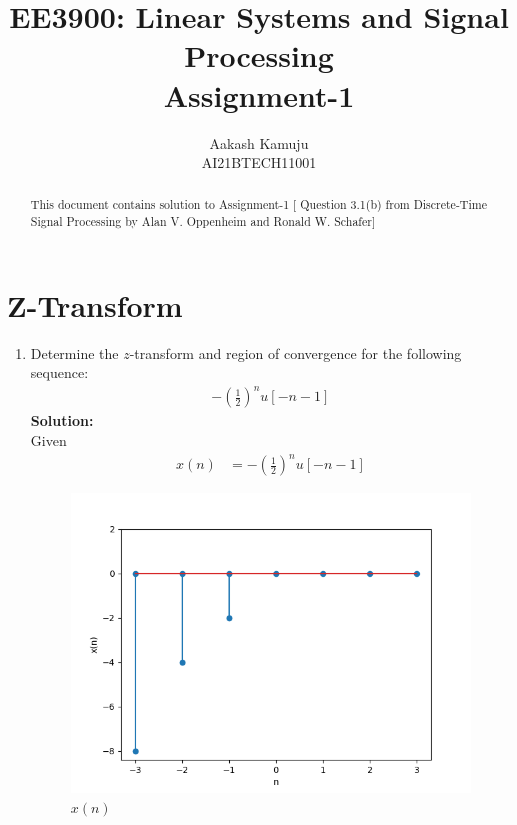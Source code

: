\documentclass[journal,12pt,twocolumn]{IEEEtran}
\newcommand{\solution}{\noindent \textbf{Solution: }}
\providecommand{\sbrak}[1]{\ensuremath{\left[#1\right]}}
\numberwithin{equation}{section}
\begin{document}
                             
\title{ EE3900: Linear Systems and Signal Processing \\ {Assignment-1}}
\author{Aakash Kamuju\\ \normalsize AI21BTECH11001 }
 \maketitle 
 \begin{abstract}
 This document contains solution to Assignment-1 [ Question 3.1(b) from Discrete-Time Signal Processing by Alan V. Oppenheim and Ronald W. Schafer]
 \end{abstract}
 \section{Z-Transform}
\begin{enumerate}[label=\arabic*]
\item Determine the $z$-transform and region of convergence for the following sequence:
\begin{align}
-\left(\frac{1}{2}\right)^n u \sbrak{-n-1}
\end{align}
\solution \\Given
\begin{align}
x(n)& =  -\left(\frac{1}{2}\right)^n u \sbrak{-n-1}
\end{align}
\begin{figure}[!ht]
\begin{center}
\includegraphics[width=\columnwidth]{./figs/Figure_1.png}
\end{center}
\caption{$x(n)$}	
\end{figure}

\end{enumerate}
\end{document}
